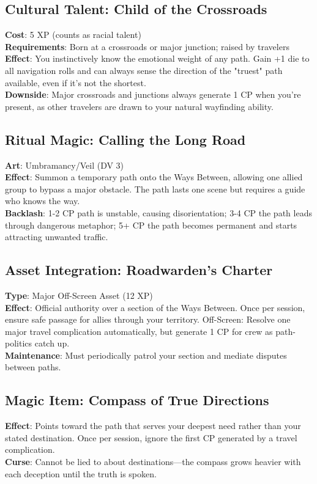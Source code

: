 \subsection*{Cultural Talent: Child of the Crossroads}
\textbf{Cost}: 5 XP (counts as racial talent) \\
\textbf{Requirements}: Born at a crossroads or major junction; raised by travelers \\
\textbf{Effect}: You instinctively know the emotional weight of any path. Gain +1 die to all navigation rolls and can always sense the direction of the "truest" path available, even if it's not the shortest. \\
\textbf{Downside}: Major crossroads and junctions always generate 1 CP when you're present, as other travelers are drawn to your natural wayfinding ability.

\subsection*{Ritual Magic: Calling the Long Road}
\textbf{Art}: Umbramancy/Veil (DV 3) \\
\textbf{Effect}: Summon a temporary path onto the Ways Between, allowing one allied group to bypass a major obstacle. The path lasts one scene but requires a guide who knows the way. \\
\textbf{Backlash}: 1-2 CP path is unstable, causing disorientation; 3-4 CP the path leads through dangerous metaphor; 5+ CP the path becomes permanent and starts attracting unwanted traffic.

\subsection*{Asset Integration: Roadwarden's Charter}
\textbf{Type}: Major Off-Screen Asset (12 XP) \\
\textbf{Effect}: Official authority over a section of the Ways Between. Once per session, ensure safe passage for allies through your territory. Off-Screen: Resolve one major travel complication automatically, but generate 1 CP for crew as path-politics catch up. \\
\textbf{Maintenance}: Must periodically patrol your section and mediate disputes between paths.

\subsection*{Magic Item: Compass of True Directions}
\textbf{Effect}: Points toward the path that serves your deepest need rather than your stated destination. Once per session, ignore the first CP generated by a travel complication. \\
\textbf{Curse}: Cannot be lied to about destinations---the compass grows heavier with each deception until the truth is spoken.

